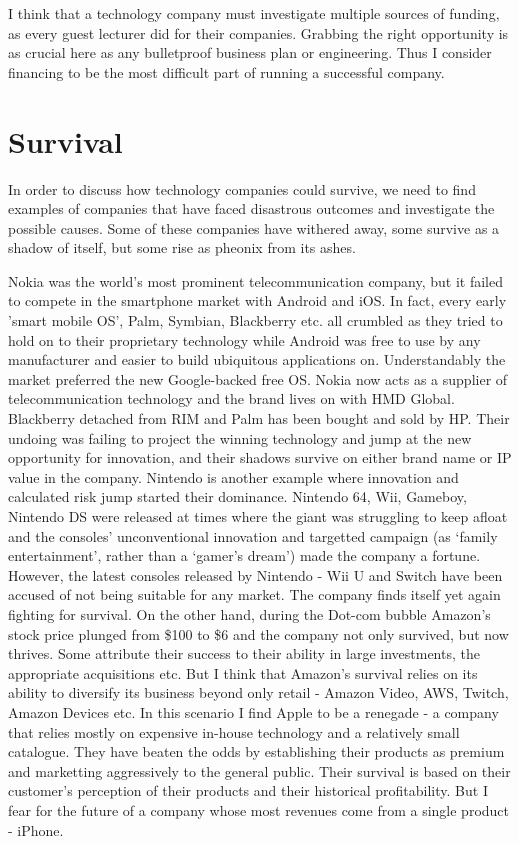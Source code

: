 \documentclass[twocolumn]{bmcart}%
\begin{document}
\par I think that a technology company must investigate multiple sources of funding, as every guest lecturer did for their companies. Grabbing the right opportunity is as crucial here as any bulletproof business plan or engineering. Thus I consider financing to be the most difficult part of running a successful company.

\section*{Survival}

In order to discuss how technology companies could survive, we need to find examples of companies that have faced disastrous outcomes and investigate the possible causes. Some of these companies have withered away, some survive as a shadow of itself, but some rise as pheonix from its ashes.\\

\par Nokia was the world's most prominent telecommunication company, but it failed to compete in the smartphone market with Android and iOS. In fact, every early 'smart mobile OS', Palm, Symbian, Blackberry etc. all crumbled as they tried to hold on to their proprietary technology while Android was free to use by any manufacturer and easier to build ubiquitous applications on. Understandably the market preferred the new Google-backed free OS. Nokia now acts as a supplier of telecommunication technology and the brand lives on with HMD Global. Blackberry detached from RIM and Palm has been bought and sold by HP. Their undoing was failing to project the winning technology and jump at the new opportunity for innovation, and their shadows survive on either brand name or IP value in the company. Nintendo is another example where innovation and calculated risk jump started their dominance. Nintendo 64, Wii, Gameboy, Nintendo DS were released at times where the giant was struggling to keep afloat and the consoles' unconventional innovation and targetted campaign (as `family entertainment', rather than a `gamer's dream') made the company a fortune. However, the latest consoles released by Nintendo - Wii U and Switch have been accused of not being suitable for any market. The company finds itself yet again fighting for survival. On the other hand, during the Dot-com bubble Amazon's stock price plunged from \$100 to \$6 and the company not only survived, but now thrives. Some attribute their success to their ability in large investments, the appropriate acquisitions etc. But I think that Amazon's survival relies on its ability to diversify its business beyond only retail - Amazon Video, AWS, Twitch, Amazon Devices etc. In this scenario I find Apple to be a renegade - a company that relies mostly on expensive in-house technology and a relatively small catalogue. They have beaten the odds by establishing their products as premium and marketting aggressively to the general public. Their survival is based on their customer's perception of their products and their historical profitability. But I fear for the future of a company whose most revenues come from a single product - iPhone.\\
\end{document}
